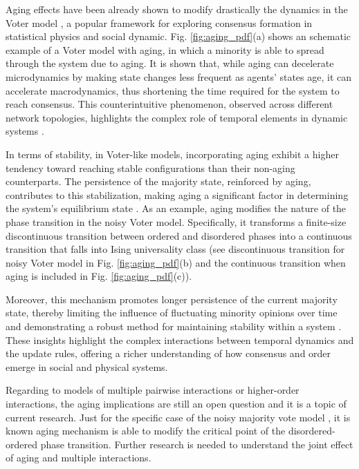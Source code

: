 Aging effects have been already shown to modify drastically the dynamics in the Voter model \cite{Voter-original}, a popular framework for exploring consensus formation in statistical physics and social dynamic. Fig. \ref{fig:aging_pdf}(a) shows an schematic example of a Voter model with aging, in which a minority is able to spread through the system due to aging. It is shown that, while aging can decelerate microdynamics by making state changes less frequent as agents' states age, it can accelerate macrodynamics, thus shortening the time required for the system to reach consensus. This counterintuitive phenomenon, observed across different network topologies, highlights the complex role of temporal elements in dynamic systems \cite{Stark2008,fernandez-gracia-2011, perez-2016, perez-2016,boguna-2014}.

In terms of stability, in Voter-like models, incorporating aging exhibit a higher tendency toward reaching stable configurations than their non-aging counterparts. The persistence of the majority state, reinforced by aging, contributes to this stabilization, making aging a significant factor in determining the system's equilibrium state \cite{peralta-2020}. As an example, aging modifies the nature of the phase transition in the noisy Voter model. Specifically, it transforms a finite-size discontinuous transition between ordered and disordered phases into a continuous transition that falls into Ising universality class \cite{artime-2018} (see discontinuous transition for noisy Voter model in Fig. \ref{fig:aging_pdf}(b) and the continuous transition when aging is included in Fig. \ref{fig:aging_pdf}(c)).

Moreover, this mechanism promotes longer persistence of the current majority state, thereby limiting the influence of fluctuating minority opinions over time and demonstrating a robust method for maintaining stability within a system \cite{peralta-2020}. These insights highlight the complex interactions between temporal dynamics and the update rules, offering a richer understanding of how consensus and order emerge in social and physical systems.

Regarding to models of multiple pairwise interactions or higher-order interactions, the aging implications are still an open question and it is a topic of current research. Just for the specific case of the noisy majority vote model \cite{chen-2020}, it is known aging mechanism is able to modify the critical point of the disordered-ordered phase transition. Further research is needed to understand the joint effect of aging and multiple interactions.